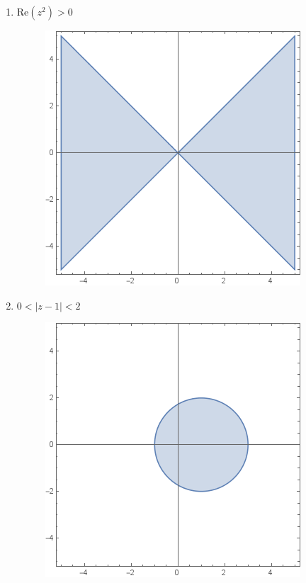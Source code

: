 \documentclass{article}
\begin{document}
\begin{enumerate}
\begin{enumerate}
		\item $\text{Re}(z^2) > 0$
			\begin{figure}[H]
			\includegraphics[scale=0.6]{6b.png}
			\end{figure}
			
		\item $0 < |z - 1| < 2$
			\begin{figure}[H]
			\includegraphics[scale=0.6]{6c.png}
			\end{figure}
		

\end{enumerate}
\end{enumerate}
\end{document}
